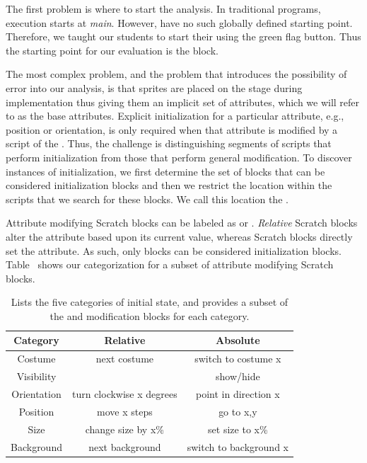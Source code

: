 The first problem is where to start the analysis.  In traditional programs,
execution starts at \emph{main}. However,  have no such globally
defined starting point. Therefore, we taught our students to start their
\sprogram{} using the green flag button. Thus the starting point for our
evaluation is the \greenflag{} block.

The most complex problem, and the problem that introduces the possibility of
error into our analysis, is that sprites are placed on the stage during
implementation thus giving them an implicit set of attributes, which we will
refer to as the base attributes. Explicit initialization for a particular
attribute, e.g., position or orientation, is only required when that attribute
is modified by a script of the \sprogram{}. Thus, the challenge is
distinguishing segments of scripts that perform initialization from those that
perform general modification. To discover instances of initialization, we first
determine the set of blocks that can be considered initialization blocks and
then we restrict the location within the scripts that we search for these
blocks. We call this location the \initzone{}.

Attribute modifying Scratch blocks can be labeled as \rel{} or
\abs{}. \emph{Relative} Scratch blocks alter the attribute based upon its
current value, whereas \abs{} Scratch blocks directly set the attribute. As
such, only \abs{} blocks can be considered initialization
blocks. Table~ shows our categorization for a
subset of attribute modifying Scratch blocks.

\begin{table}
\centering
\begin{tabular}{|c|c|c|} \hline
Category & Relative&Absolute\\ \hline \hline
Costume& next costume & switch to costume x\\ \hline
Visibility& & show/hide\\ \hline
Orientation&turn clockwise x degrees&point in direction x\\ \hline
Position&move x steps & go to x,y\\ \hline
Size&change size by x\% & set size to x\%\\ \hline
Background&next background & switch to background x\\ \hline
\end{tabular}
\caption{Lists the five categories of initial state, and provides a subset of
  the \rel{} and \abs{} modification blocks for each category.}
\end{table}

